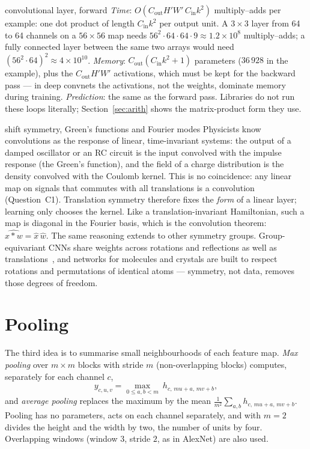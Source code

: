 \documentclass[11pt]{article}
\newcommand{\Cin}{C_{\mathrm{in}}}
\newcommand{\Cout}{C_{\mathrm{out}}}
\newcommand{\Hout}{H'}
\newcommand{\Wout}{W'}
\begin{document}
\begin{runtime}{convolutional layer, forward}
\emph{Time}: $O(\Cout\Hout\Wout\,\Cin k^2)$ multiply--adds per example: one dot product of length $\Cin k^2$ per output
unit. A $3 \times 3$ layer from 64 to 64 channels on a $56 \times 56$ map needs $56^2 \cdot 64 \cdot 64 \cdot 9 \approx
1.2 \times 10^8$ multiply--adds; a fully connected layer between the same two arrays would need $(56^2 \cdot 64)^2
\approx 4 \times 10^{10}$. \emph{Memory}: $\Cout(\Cin k^2 + 1)$ parameters ($36\,928$ in the example), plus the
$\Cout\Hout\Wout$ activations, which must be kept for the backward pass --- in deep convnets the activations, not the
weights, dominate memory during training. \emph{Prediction}: the same as the forward pass. Libraries do not run these
loops literally; Section~\ref{sec:arith} shows the matrix-product form they use.
\end{runtime}

\begin{physics}{shift symmetry, Green's functions and Fourier modes}
Physicists know convolutions as the response of linear, time-invariant systems: the output of a damped oscillator or
an RC circuit is the input convolved with the impulse response (the Green's function), and the field of a charge
distribution is the density convolved with the Coulomb kernel. This is no coincidence: any linear map on signals that
commutes with all translations is a convolution (Question~C1). Translation symmetry therefore fixes the \emph{form} of a
linear layer; learning only chooses the kernel. Like a translation-invariant Hamiltonian, such a map is diagonal in the
Fourier basis, which is the convolution theorem: $\widehat{x * w} = \hat x\,\hat w$. The same reasoning extends to other
symmetry groups. Group-equivariant CNNs share weights across rotations and reflections as well as
translations~\cite{cohen2016}, and networks for molecules and crystals are built to respect rotations and permutations of
identical atoms --- symmetry, not data, removes those degrees of freedom.
\end{physics}

\section{Pooling}\label{sec:pool}

The third idea is to summarise small neighbourhoods of each feature map. \emph{Max pooling} over $m \times m$ blocks with
stride $m$ (non-overlapping blocks) computes, separately for each channel $c$,
\begin{equation}\label{eq:maxpool}
  y_{c,u,v} = \max_{0 \le a, b < m}\ h_{c,\,mu + a,\,mv + b} ,
\end{equation}
and \emph{average pooling} replaces the maximum by the mean $\frac{1}{m^2}\sum_{a,b} h_{c,\,mu+a,\,mv+b}$. Pooling has no
parameters, acts on each channel separately, and with $m = 2$ divides the height and the width by two, the number of
units by four. Overlapping windows (window $3$, stride $2$, as in AlexNet) are also used.
\end{document}
